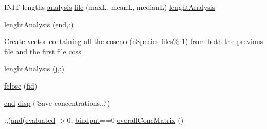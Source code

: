 \begin{DoxyCompactItemize}
\item 
I\-N\-I\-T lengths \hyperlink{a00032_abf6e5638a23a2531114655f3f690b70c}{analysis} \hyperlink{a00025_a10e64101d80ef71182bd7b1250e59135}{file} (max\-L, mean\-L, median\-L) \hyperlink{a00025_a3b1ab2e105a6a3b8ed1ee6b0b0f11792}{lenght\-Analysis}
\item 
\hyperlink{a00025_a7a3c9de2d82a97c217e41d93905be493}{lenght\-Analysis} (\hyperlink{a00025_afb358f48b1646c750fb9da6c6585be2b}{end},\-:)
\item 
Create vector containing all the \hyperlink{a00025_a52f1bbbf72ac97a5d451adc330decd0b}{coseno} (n\-Species files\%-\/1) \hyperlink{a00028_aa7b4fe13e75a69fca72862effeaf6196}{from} both the previous \hyperlink{a00110_a4e8353d6c62cf54bf4a1a8f63e56b8c3}{file} \hyperlink{a00028_a170f8acb213f91bf71c77b1d20bceb33}{and} the first \hyperlink{a00110_a4e8353d6c62cf54bf4a1a8f63e56b8c3}{file} \hyperlink{a00025_aef980037b6271b6ab8be33ae415ef453}{coss}
\item 
\hyperlink{a00025_a3b1ab2e105a6a3b8ed1ee6b0b0f11792}{lenght\-Analysis} (\hyperlink{a00110_ac86694252f8dfdb19aaeadc4b7c342c6}{j},\-:)
\item 
\hyperlink{a00025_a5e769bbbabcaddc548203741c7100228}{fclose} (\hyperlink{a00031_ae9011d40c6f13e68e6f07156e0da7c5d}{fid})
\item 
\hyperlink{a00025_afb358f48b1646c750fb9da6c6585be2b}{end} \hyperlink{a00025_a2985ef58c816724bba3cccbf43c4f936}{disp} ('Save concentrations...')
\item 
\-:,(\hyperlink{a00028_a170f8acb213f91bf71c77b1d20bceb33}{and}(\hyperlink{a00025_a5e1fe2a8074aede6ad4a7a0613f0f91c}{evaluated} $>$0, \hyperlink{a00025_abe7c50c8b184b4269ba5aaecedcd5457}{bindpnt}==0 \hyperlink{a00025_a576dd8edd1b0fd4cc65709a59b308518}{overall\-Conc\-Matrix} ()
\end{DoxyCompactItemize}
